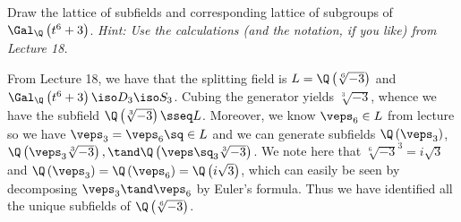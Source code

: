 \documentclass{article}
\begin{document}
\begin{exercise}
  Draw the lattice of subfields and corresponding lattice of subgroups of \( \Gal_\Q\left(t^6 + 3\right) \). \it{Hint}: Use the calculations (and the notation, if you like) from Lecture 18.
\end{exercise}
\begin{solution}
  From Lecture 18, we have that the splitting field is \( L=\Q\left( \sqrt[6]{-3} \right) \) and \( \Gal_{\Q}\left(t^6+3\right) \iso D_3 \iso S_3 \).
  Cubing the generator yields \( \sqrt[3]{-3} \), whence we have the subfield \( \Q\left(\sqrt[3]{-3}\right)\sseq L \).
  Moreover, we know \( \veps_6\in L \) from lecture so we have \( \veps_3 = \veps_6\sq \in L \) and we can generate subfields \( \Q\left(\veps_3\right) \), \( \Q\left( \veps_3\sqrt[3]{-3} \right),\tand\Q\left( \veps\sq_3\sqrt[3]{-3} \right) \).
  We note here that \( \sqrt[6]{-3}^3 = i\sqrt{3} \) and \( \Q\left(\veps_3\right)=\Q\left(\veps_6\right)=\Q\left(i\sqrt{3}\right) \), which can easily be seen by decomposing \( \veps_3\tand \veps_6 \) by Euler's formula.
  Thus we have identified all the unique subfields of \( \Q\left(\sqrt[6]{-3}\right) \).
\end{solution}
\end{document}
